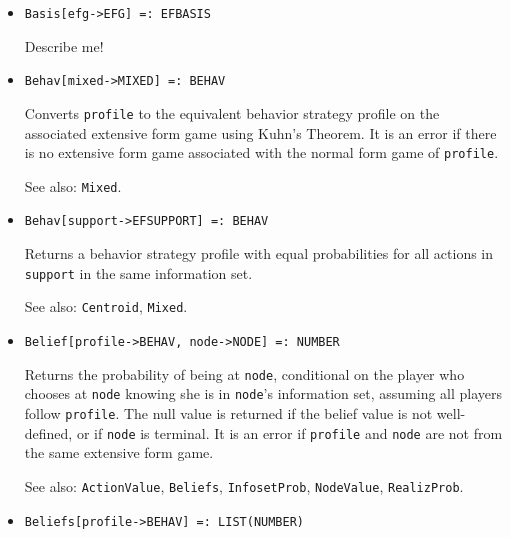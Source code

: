 \begin{itemize}

\item{}
\protect \large \begin{verbatim}
Basis[efg->EFG] =: EFBASIS
\end{verbatim}\normalsize

\bd
Describe me!
\ed

\item{}
\protect \large \begin{verbatim}
Behav[mixed->MIXED] =: BEHAV 
\end{verbatim}\normalsize

\bd
{}
Converts \verb+profile+ to the equivalent behavior strategy profile on the
associated extensive form game using Kuhn's Theorem.  It is an error
if there is no extensive form game associated with the normal form game
of \verb+profile+.
\item [See also:] \verb+Mixed+.
\ed

\item{}
\protect \large \begin{verbatim}
Behav[support->EFSUPPORT] =: BEHAV 
\end{verbatim}\normalsize

\bd
Returns a behavior strategy profile with equal
probabilities for all actions in \verb+support+ in the same information set. 
\item [See also:] \verb+Centroid+, \verb+Mixed+.
\ed

\item{}
\protect \large \begin{verbatim}
Belief[profile->BEHAV, node->NODE] =: NUMBER 
\end{verbatim}\normalsize

\bd
Returns the probability of being at \verb+node+, conditional on the
player who chooses at \verb+node+ knowing she is in \verb+node+'s
information set, assuming all players follow \verb+profile+.  The null
value is returned if the belief value is not well-defined, or if
\verb+node+ is terminal.  It is an error if \verb+profile+ and \verb+node+
are not from the same extensive form game.
\item [See also:] \verb+ActionValue+, \verb+Beliefs+, \verb+InfosetProb+,
\verb+NodeValue+, \verb+RealizProb+.
\ed

\item{}
\protect \large \begin{verbatim}
Beliefs[profile->BEHAV] =: LIST(NUMBER) 
\end{verbatim}\normalsize


\end{itemize}
